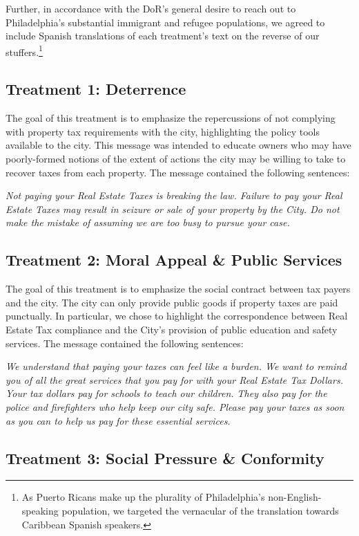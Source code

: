 \documentclass[12pt,titlepage]{article}
\begin{document}
Further, in accordance with the DoR's general desire to reach out to
Philadelphia's substantial immigrant and refugee populations, we agreed to include Spanish
translations of each treatment's text on the reverse of our
stuffers.\footnote{As Puerto Ricans make up the plurality of
  Philadelphia's non-English-speaking population, we targeted the vernacular of
  the translation towards Caribbean Spanish speakers.}
  
\subsection{Treatment 1: Deterrence}

The goal of this treatment is to emphasize the repercussions
of not complying with property tax requirements with the city,
highlighting the policy tools available to the city. This message was
intended to educate owners who may have poorly-formed notions of the
extent of actions the city may be willing to take to recover taxes from
each property. The message contained the following sentences:

{\it Not paying your Real Estate Taxes is breaking the law. Failure to
  pay your Real Estate Taxes may result in seizure or sale of your
  property by the City. Do not make the mistake of assuming we are too
  busy to pursue your case.}

\subsection{Treatment 2: Moral Appeal \& Public Services}

The goal of this treatment is to emphasize the social contract
between tax payers and the city. The city can only provide
public goods if property taxes are paid punctually.  In particular, we
chose to highlight the correspondence between Real Estate Tax
compliance and the City's provision of public education and safety
services. The message contained the following sentences:

{\it We understand that paying your taxes can feel like a burden. We
  want to remind you of all the great services that you pay for with
  your Real Estate Tax Dollars. Your tax dollars pay for schools to
  teach our children.  They also pay for the police and firefighters
  who help keep our city safe.  Please pay your taxes as soon as you
  can to help us pay for these essential services.}

\subsection{Treatment 3: Social Pressure \& Conformity}
\end{document}

